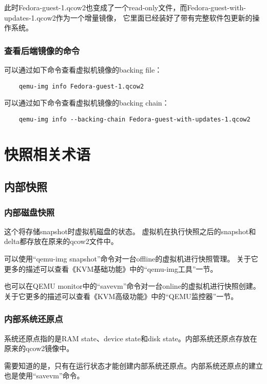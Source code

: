 \documentclass[a4paper,left=1.5cm,right=1.5cm,11pt]{article}
\begin{document}
    此时Fedora-guest-1.qcow2也变成了一个read-only文件，而Fedora-guest-with-updates-1.qcow2作为一个增量镜像，
    它里面已经装好了带有完整软件包更新的操作系统。\par

\subsubsection{查看后端镜像的命令}

    可以通过如下命令查看虚拟机镜像的backing file：
    \begin{lstlisting}
    qemu-img info Fedora-guest-1.qcow2
    \end{lstlisting}

    可以通过如下命令查看虚拟机镜像的backing chain：
    \begin{lstlisting}
    qemu-img info --backing-chain Fedora-guest-with-updates-1.qcow2
    \end{lstlisting}

\clearpage

\section{快照相关术语}
\subsection{内部快照}
\subsubsection{内部磁盘快照}
    这个将存储snapshot时虚拟机磁盘的状态。
    虚拟机在执行快照之后的snapshot和delta都存放在原来的qcow2文件中。\par

    可以使用“qemu-img snapshot”命令对一台offline的虚拟机进行快照管理。
    关于它更多的描述可以查看《KVM基础功能》中的“qemu-img工具”一节。\par
    也可以在QEMU monitor中的“savevm”命令对一台online的虚拟机进行快照创建。
    关于它更多的描述可以查看《KVM高级功能》中的“QEMU监控器”一节。

\subsubsection{内部系统还原点}
    系统还原点指的是RAM state、device state和disk state。内部系统还原点存放在原来的qcow2镜像中。\par

    需要知道的是，只有在运行状态才能创建内部系统还原点。内部系统还原点的建立也是使用“savevm”命令。
\end{document}

